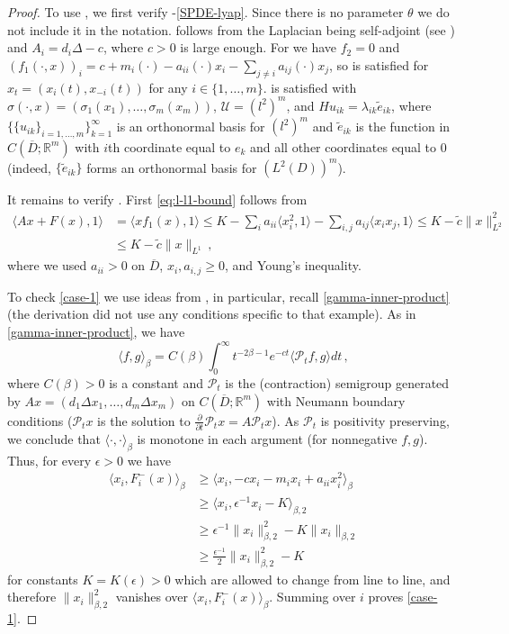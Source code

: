 \documentclass[final]{amsart}
\numberwithin{thm}{section}
\numberwithin{equation}{section}
\newcommand{\U}{\mathcal{U}}
\newcommand{\Pp}{\mathcal{P}}
\newcommand{\R}{\mathbb{R}}
\newcommand{\ip}[2]{\langle #1, #2 \rangle}
\begin{document}
\begin{proof}
    To use , we first verify -\ref{SPDE-lyap}. Since there is no parameter $\theta$ we do not include it in the notation.  follows from the Laplacian being self-adjoint (see ) and $A_i = d_i\Delta - c$, where $c > 0$ is large enough. For  we have $f_2 = 0$ and $(f_1(\cdot,x))_i = c + m_i(\cdot) - a_{ii}(\cdot)x_i - \sum_{j\neq i} a_{ij}(\cdot)x_j$, so  is satisfied for $x_t = (x_i(t),x_{-i}(t))$ for any $i \in \{1,\dots,m\}$.  is satisfied with $\sigma(\cdot,x) = (\sigma_1(x_1),\dots,\sigma_m(x_m))$, $\U = (l^2)^m$, and $Hu_{ik} = \lambda_{ik}\tilde e_{ik}$, where $\{\{u_{ik}\}_{i=1,\dots,m}\}_{k=1}^\infty$ is an orthonormal basis for $(l^2)^m$ and $\tilde e_{ik}$ is the function in $C(\overline D;\R^m)$ with $i$th coordinate equal to $e_k$ and all other coordinates equal to $0$ (indeed, $\{\tilde e_{ik}\}$ forms an orthonormal basis for $(L^2(D))^m$).

    It remains to verify . First \eqref{eq:l-l1-bound} follows from 
    \begin{align*}
        \ip{Ax + F(x)}{1} &= \ip{xf_1(x)}{1} \leq K - \sum_{i} a_{ii} \ip{x_i^2}{1} - \sum_{i,j} a_{ij} \ip{x_ix_j}{1} \leq K - \tilde c\|x\|_{L^2}^2 \\
        &\leq K - \tilde c\|x\|_{L^1} \,,
    \end{align*}
    where we used $a_{ii} > 0$ on $\overline{D}$, $x_i, a_{i, j} \geq 0$, and Young's inequality. 
    
    To check \ref{case-1} we use ideas from , in particular, recall \eqref{gamma-inner-product} (the derivation did not use any conditions specific to that example). 
    As in \eqref{gamma-inner-product}, we have 
    $$
    \ip{f}{g}_\beta = C(\beta)\int_0^\infty t^{-2\beta-1}e^{-ct}\ip{\Pp_t f}{g} dt \,,
    $$
    where $C(\beta) > 0$ is a constant and $\Pp_t$ is the (contraction) semigroup generated by $Ax = (d_1\Delta x_1,\dots,d_m \Delta x_m)$ on $C(\overline D;\R^m)$ with Neumann boundary conditions ($\Pp_t x$ is the solution to $\frac{\partial}{\partial t} \Pp_t x = A\Pp_t x$). As $\Pp_t$ is positivity preserving, we conclude that $\ip{\cdot}{\cdot}_\beta$ is monotone in each argument (for nonnegative $f,g$). Thus, for every $\epsilon > 0$ we have
    \begin{align*}
        \ip{x_i}{F_i^-(x)}_\beta &\geq \ip{x_i}{-cx_i - m_ix_i + a_{ii}x_i^2}_\beta \\
        &\geq \ip{x_i}{\epsilon^{-1} x_i - K}_{\beta,2} \\
        &\geq \epsilon^{-1} \|x_i\|_{\beta,2}^2 - K\|x_i\|_{\beta,2} \\
        &\geq \frac{\epsilon^{-1}}{2}\|x_i\|_{\beta,2}^2 - K
    \end{align*}
    for constants $K = K(\epsilon) > 0$ which are allowed to change from line to line, and therefore $\|x_i\|_{\beta,2}^2$ vanishes over $\ip{x_i}{F_i^-(x)}_\beta$. Summing over $i$ proves \ref{case-1}.



\end{proof}
\end{document}
